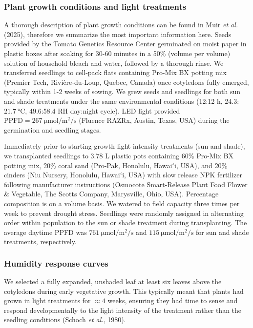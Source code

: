\documentclass[
  letterpaper,
  DIV=11,
  numbers=noendperiod]{scrartcl}
\newcommand{\ppfd}{$\mathrm{PPFD}$}
\newcommand{\ppfdqty}[1]{$\SI{#1}{\micro\mole\per\meter\squared\per\second}$}
\providecommand{\DIFdelend}{} %
\DeclareRobustCommand{\DIFdelend}{\DIFOaddend \let\includegraphics\DIFOincludegraphics} %
\begin{document}
\DIFdelend \subsubsection{Plant growth conditions and light
treatments}\label{plant-growth-conditions-and-light-treatments}

A thorough description of plant growth conditions can be found in Muir
\emph{et al.} (2025), therefore we summarize the most important
information here. Seeds provided by the Tomato Genetics Resource Center
germinated on moist paper in plastic boxes after soaking for 30-60
minutes in a 50\% (volume per volume) solution of household bleach and
water, followed by a thorough rinse. We transferred seedlings to
cell-pack flats containing Pro-Mix BX potting mix (Premier Tech,
Rivière-du-Loup, Quebec, Canada) once cotyledons fully emerged,
typically within 1-2 weeks of sowing. We grew seeds and seedlings for
both sun and shade treatments under the same environmental conditions
(12:12 h, 24.3:\(\SI{21.7}{\degreeCelsius}\), 49.6:58.4 RH day:night
cycle). LED light provided
\(\mathrm{PPFD} = \SI{267}{\micro\mole\per\meter\squared\per\second}\)
(Fluence RAZRx, Austin, Texas, USA) during the germination and seedling
stages.

Immediately prior to starting growth light intensity treatments (sun and
shade), we transplanted seedlings to 3.78 L plastic pots containing 60\%
Pro-Mix BX potting mix, 20\% coral sand (Pro-Pak, Honolulu, Hawaiʻi,
USA), and 20\% cinders (Niu Nursery, Honolulu, Hawaiʻi, USA) with slow
release NPK fertilizer following manufacturer instructions (Osmocote
Smart-Release Plant Food Flower \& Vegetable, The Scotts Company,
Marysville, Ohio, USA). Percentage composition is on a volume basis. We
watered to field capacity three times per week to prevent drought
stress. Seedlings were randomly assigned in alternating order within
population to the sun or shade treatment during transplanting. The
average daytime \ppfd{} was \ppfdqty{761} and \ppfdqty{115} for sun and
shade treatments, respectively.

\subsubsection{Humidity response curves}\label{humidity-response-curves}

We selected a fully expanded, unshaded leaf at least six leaves above
the cotyledons during early vegetative growth. This typically meant that
plants had grown in light treatments for \(\approx 4\) weeks, ensuring
they had time to sense and respond developmentally to the light
intensity of the treatment rather than the seedling conditions (Schoch
\emph{et al.}, 1980).
\end{document}
